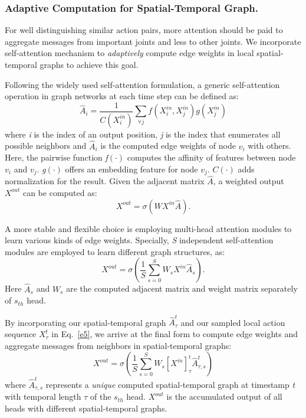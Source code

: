 \documentclass[runningheads]{llncs}
\begin{document}
\subsubsection{Adaptive Computation for Spatial-Temporal Graph.}
For well distinguishing similar action pairs, more attention should be paid to aggregate messages from important joints and less to other joints. We incorporate self-attention mechanism to \textit{adaptively} compute edge weights in local spatial-temporal graphs to achieve this goal. 

Following the widely used self-attention formulation, a generic self-attention operation in graph networks at each time step can be defined as:
\begin{equation}
\label{e4}
\widehat{A}_{i}=\frac{1}{C(X_{i}^{in})}\sum_{\forall j}{f(X_{i}^{in},X_{j}^{in})}g(X_{j}^{in})
\end{equation}
where \textit{i} is the index of an output position, \textit{j} is the index that enumerates all possible neighbors and $\widehat{A}_{i}$ is the computed edge weights of node \textit{$v_i$} with others. Here, the pairwise function \textit{f}$(\cdot)$ computes the affinity of features between node \textit{$v_i$} and \textit{$v_j$}. \textit{g}$(\cdot)$ offers an embedding feature for node \textit{$v_j$}. $C(\cdot)$ adds normalization for the result. Given the adjacent matrix $\widehat{A}$, a weighted output $X^{out}$ can be computed as:
\begin{equation}
\label{e5}
X^{out}=\sigma(WX^{in}\widehat{A}).
\end{equation}  

A more stable and flexible choice is employing multi-head attention modules to learn various kinds of edge weights. Specially, \textit{S} independent self-attention modules are employed to learn different graph structures, as:
\begin{equation}
\label{e6}
X^{out}=\sigma(\frac{1}{S}\sum_{s=0}^{S}W_sX^{in}\widehat{A}_{s}).
\end{equation}
Here $\widehat{A}_{s}$ and $W_s$ are the computed adjacent matrix and weight matrix separately of $s_{th}$ head. 
  
By incorporating our spatial-temporal graph $\widehat{A}^{t}_{\tau}$ and our sampled local action sequence $X^{t}_{\tau}$ in Eq.~\ref{e5}, we arrive at the final form to compute edge weights and aggregate messages from neighbors in spatial-temporal graphs:
\begin{equation}
\label{e7}
X^{out}=\sigma(\frac{1}{S}\sum_{s=0}^{S}W_s[X^{in}]^{t}_{\tau}\widehat{A}^{t}_{\tau,s})
\end{equation}
where $\widehat{A}^{t}_{\tau,s}$ represents a \textit{unique} computed spatial-temporal graph at timestamp \textit{t} with temporal length $\tau$ of the $s_{th}$ head. $X^{out}$ is the accumulated output of all heads with different spatial-temporal graphs. 
  
\end{document}
